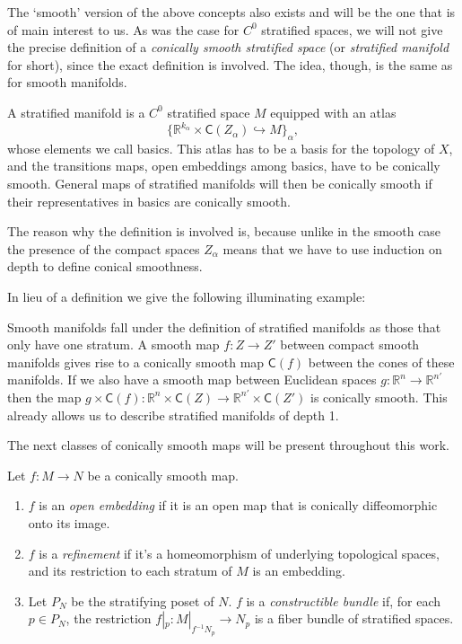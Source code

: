 \documentclass[../text]{subfiles}
\begin{document}
The `smooth' version of the above concepts also exists and will be the one that is of main interest to us. As was the case for $C^0$ stratified spaces, we will not give the precise definition of a \emph{conically smooth stratified space} (or \emph{stratified manifold} for short), since the exact definition is involved. The idea, though, is the same as for smooth manifolds.

A stratified manifold is a $C^0$ stratified space $M$ equipped with an atlas
%
\begin{equation}
    \{\mathbb{R}^{k_\alpha} \times \mathsf{C}(Z_\alpha) \hookrightarrow M\}_\alpha,
\end{equation}
%
whose elements we call basics. This atlas has to be a basis for the topology of $X$, and the transitions maps, open embeddings among basics, have to be conically smooth. General maps of stratified manifolds will then be conically smooth if their representatives in basics are conically smooth.

The reason why the definition is involved is, because unlike in the smooth case the presence of the compact spaces $Z_\alpha$ means that we have to use induction on depth to define conical smoothness.

In lieu of a definition we give the following illuminating example:
%
\begin{example}
    Smooth manifolds fall under the definition of stratified manifolds as those that only have one stratum. A smooth map $f: Z \xrightarrow{} Z'$ between compact smooth manifolds gives rise to a conically smooth map $\mathsf{C}(f)$ between the cones of these manifolds. If we also have a smooth map between Euclidean spaces $g: \mathbb{R}^{n} \xrightarrow{} \mathbb{R}^{n'}$ then the map $g \times \mathsf{C}(f): \mathbb{R}^{n} \times \mathsf{C} (Z) \xrightarrow{} \mathbb{R}^{n'} \times \mathsf{C} (Z')$ is conically smooth. This already allows us to describe stratified manifolds of depth 1.
\end{example}

The next classes of conically smooth maps will be present throughout this work.

\begin{definition}
    Let $f: M \rightarrow N$ be a conically smooth map.
    \begin{enumerate}
        \item $f$ is an \emph{open embedding} if it is an open map that is conically diffeomorphic onto its image.
        \item $f$ is a \emph{refinement} if it's a homeomorphism of underlying topological spaces, and its restriction to each stratum of $M$ is an embedding.
        \item Let $P_N$ be the stratifying poset of $N$. $f$ is a \emph{constructible bundle} if, for each $p \in P_N$, the restriction $f|_p: M|_{f^{-1} N_p} \rightarrow N_p$ is a fiber bundle of stratified spaces.
    \end{enumerate}
\end{definition}
\end{document}
